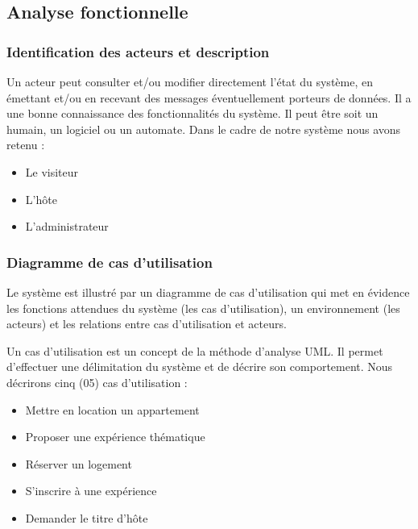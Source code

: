 \subsection{Analyse fonctionnelle} 
\subsubsection{Identification des acteurs et description} 
Un acteur peut consulter et/ou modifier directement l’état du système, en émettant et/ou en recevant des messages éventuellement porteurs de données. Il a une bonne connaissance des fonctionnalités du système. Il peut être soit un humain, un logiciel ou un automate. Dans le cadre de notre système nous avons retenu :
\begin{itemize}
\item[\textbullet] Le visiteur
\item[\textbullet] L’hôte
\item[\textbullet] L’administrateur
\end{itemize}

\subsubsection{Diagramme de cas d’utilisation} 
Le système est illustré par un diagramme de cas d’utilisation qui met en évidence les fonctions attendues du système (les cas d’utilisation), un environnement (les acteurs) et les relations entre cas d’utilisation et acteurs.

Un cas d’utilisation est un concept de la méthode d’analyse UML. Il permet d’effectuer une délimitation du système et de décrire son comportement. Nous décrirons cinq (05) cas d’utilisation :
\begin{itemize}
\item[\textbullet] Mettre en location un appartement
\item[\textbullet] Proposer une expérience thématique
\item[\textbullet] Réserver un logement
\item[\textbullet] S’inscrire à une expérience
\item[\textbullet] Demander le titre d’hôte
\end{itemize}

